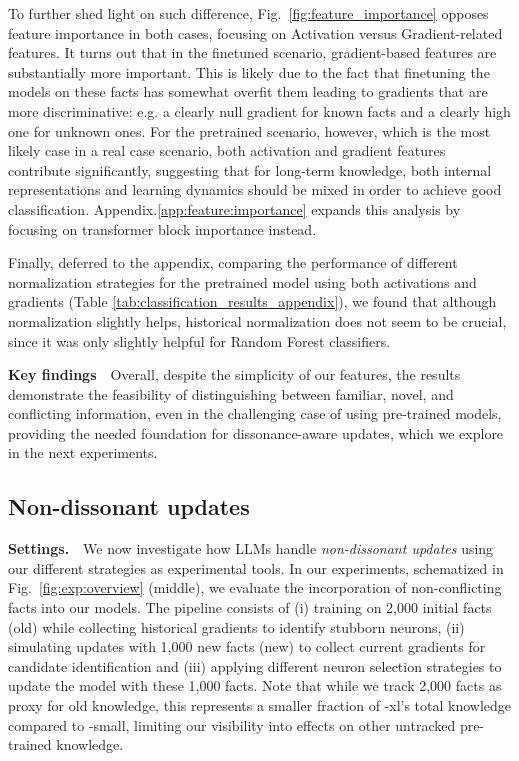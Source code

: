 To further shed light on such difference, Fig.~\ref{fig:feature_importance} opposes feature importance in both cases, focusing on Activation versus Gradient-related features. It turns out that in the finetuned scenario, gradient-based features are substantially more important. This is likely due to the fact that finetuning the models on these facts has somewhat overfit them leading to gradients that are more discriminative: e.g. a clearly null gradient for known facts and a clearly high one for unknown ones. For the pretrained scenario, however, which is the most likely case in a real case scenario, both activation and gradient features contribute significantly, suggesting that for long-term knowledge, both internal representations and learning dynamics should be mixed in order to achieve good classification. Appendix.\ref{app:feature:importance} expands this analysis by focusing on transformer block importance instead.

Finally, deferred to the appendix, comparing the performance of different normalization strategies for the pretrained model using both activations and gradients (Table \ref{tab:classification_results_appendix}), we found that although normalization slightly helps, historical normalization does not seem to be crucial, since it was only slightly helpful for Random Forest classifiers.

\textbf{Key findings}\ \   Overall, despite the simplicity of our features, the results demonstrate the feasibility of distinguishing between familiar, novel, and conflicting information, even in the challenging case of using pre-trained models, providing the needed foundation for dissonance-aware updates, which we explore in the next experiments. 

\subsection{Non-dissonant updates}\label{sec:non:dissonant} 

\textbf{Settings.}\ \  We now investigate how LLMs handle \textit{non-dissonant updates} using our different strategies as experimental tools.
In our experiments, schematized in Fig.~\ref{fig:exp:overview} (middle), we evaluate the incorporation of non-conflicting facts into our models.
The pipeline consists of (i) training on 2,000 initial facts (old) while collecting historical gradients to identify stubborn neurons, (ii) simulating updates with 1,000 new facts (new) to collect current gradients for candidate identification and (iii) applying different neuron selection strategies to update the model with these 1,000 facts. Note that while we track 2,000 facts as proxy for old knowledge, this represents a smaller fraction of \gpttwo-xl's total knowledge compared to \gpttwo-small, limiting our visibility into effects on other untracked pre-trained knowledge.

